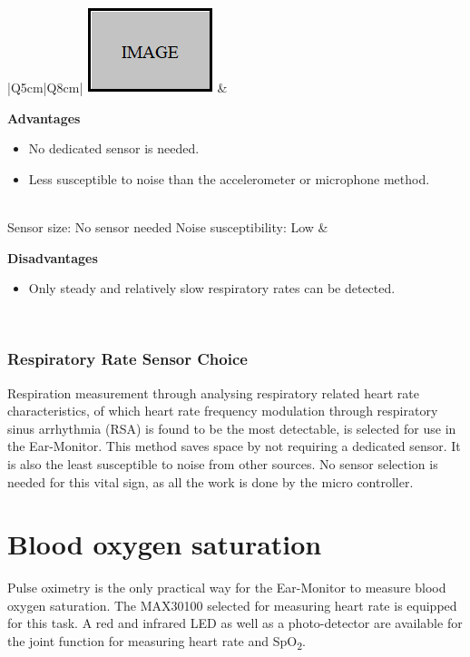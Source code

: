 \begin{table}[H]
\caption{Respiratory related heart rate characteristics}
\label{tab:EarRRHRC_Eval}
\renewcommand{\arraystretch}{1.3}	%
\centering
\begin{tabular}{|Q{5cm}|Q{8cm}|} 
 \hline
 \includegraphics[scale=0.8]{figs/Image.png} &
  			
  	\textbf{Advantages}
	\begin{itemize}[leftmargin=1em, noitemsep, topsep=2pt]	  
	\item No dedicated sensor is needed.
	\item Less susceptible to noise than the accelerometer or microphone method.
	\end{itemize}\\ 
	
\hline
Sensor size: No sensor needed	\newline
Noise susceptibility: Low			&	

	\textbf{Disadvantages}
	\begin{itemize}[leftmargin=1em, noitemsep, topsep=2pt]	  
	\item Only steady and relatively slow respiratory rates can be detected.
	\end{itemize}\\
	
\hline
\end{tabular}
\end{table}

\subsubsection{Respiratory Rate Sensor Choice}
Respiration measurement through analysing respiratory related heart rate characteristics, of which heart rate frequency modulation through respiratory sinus arrhythmia (RSA) is found to be the most detectable, is selected for use in the Ear-Monitor. This method saves space by not requiring a dedicated sensor. It is also the least susceptible to noise from other sources. No sensor selection is needed for this vital sign, as all the work is done by the micro controller.

\section{Blood oxygen saturation}
Pulse oximetry is the only practical way for the Ear-Monitor to measure blood oxygen saturation. The MAX30100 selected for measuring heart rate is equipped for this task. A red and infrared LED as well as a photo-detector are available for the joint function for measuring heart rate and SpO\textsubscript{2}.


